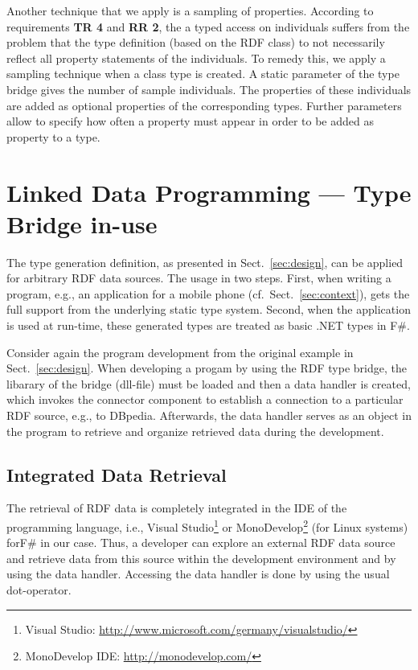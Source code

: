 \documentclass{llncs} %
\newcommand{\fs}{\textsf{F\#}\xspace}
\newcommand{\rr}[1]{\textbf{RR #1}}
\newcommand{\tr}[1]{\textbf{TR #1}}
\begin{document}
Another technique that we apply is a sampling of properties. According to requirements \tr{4} and \rr{2}, the a typed access on individuals
suffers from the problem that the type definition (based on the RDF class) to not necessarily reflect all property statements
of the individuals. To remedy this, we apply a sampling technique when a class type is created.
A static parameter of the type bridge gives the number of sample individuals. The properties of these individuals
are added as optional properties of the corresponding types. Further parameters allow to specify
how often a property must appear in order to be added as property to a type.

	
\section{Linked Data Programming --- Type Bridge in-use}
\label{sec:usage}

The type generation definition, as presented in Sect.~\ref{sec:design}, can be applied for arbitrary RDF data sources.
The usage in two steps. First, when writing a program, e.g., an application for a mobile phone (cf.~Sect.~\ref{sec:context}),
gets the full support from the underlying static type system.
Second, when the application is used at run-time, these generated types are treated as basic .NET types in \fs.

Consider again the program development from the original example in Sect.~\ref{sec:design}.
When developing a progam by using the RDF type bridge, the libarary of the bridge (dll-file) must
be loaded and then a data handler is created, which invokes the connector component to
establish a connection to a particular RDF source, e.g., to DBpedia. Afterwards, the data handler
serves as an object in the program to retrieve and organize retrieved data during the development.

\subsection{Integrated Data Retrieval}

The retrieval of RDF data is completely integrated in the IDE of the programming language,
i.e., Visual Studio\footnote{Visual Studio: \url{http://www.microsoft.com/germany/visualstudio/}}
or MonoDevelop\footnote{MonoDevelop IDE: \url{http://monodevelop.com/}} (for Linux systems) for\fs in our case.
Thus, a developer can explore an external RDF data source and retrieve data from this source
within the development environment and by using the data handler.
Accessing the data handler is done by using  the usual dot-operator.
\end{document}
